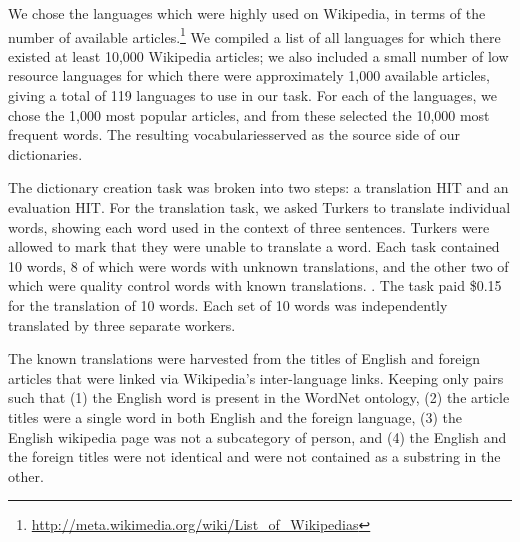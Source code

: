 \documentclass[11pt]{article}
\begin{document}
We chose the languages which were highly used on Wikipedia, in terms of the number of available articles.\footnote{\url{http://meta.wikimedia.org/wiki/List_of_Wikipedias}} We compiled a list of all languages for which there existed at least 10,000 Wikipedia articles; we also included a small number of low resource languages for which there were approximately 1,000 available articles, giving a total of 119 languages to use in our task. For each of the languages, we chose the 1,000 most popular articles, and from these selected the 10,000 most frequent words. The resulting vocabulariesserved as the source side of our dictionaries.

The dictionary creation task was broken into two steps: a translation HIT and an evaluation HIT. 
For the translation task, we asked Turkers to translate individual words, showing each word used in the context of three sentences.  Turkers were allowed to mark that they were unable to translate a word. Each task contained 10 words, 8 of which were words with unknown translations, and the other two of which were quality control words with known translations.  .   The task paid \$0.15 for the translation of 10 words.  Each set of 10 words was independently translated by three separate workers.  

The known translations were harvested from the titles of English and foreign articles that were linked via Wikipedia's inter-language links.
Keeping only pairs such that (1) the English word is present in the WordNet ontology, (2) the article titles were a single word in both English and the foreign language, (3) the English wikipedia page was not a subcategory of person, and (4) the English and the foreign titles were not identical and were not contained as a substring in the other.
\end{document}
